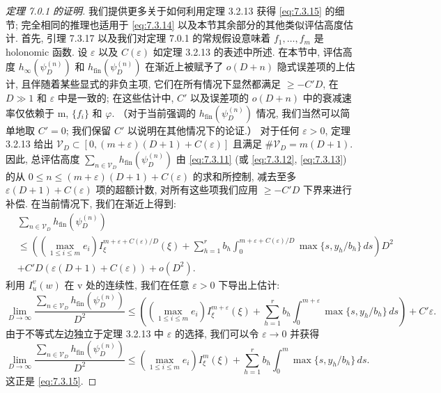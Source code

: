 \begin{proof}[定理 7.0.1 的证明]
我们提供更多关于如何利用定理 3.2.13 获得 \eqref{eq:7.3.15} 的细节; 
完全相同的推理也适用于 \eqref{eq:7.3.14} 以及本节其余部分的其他类似评估高度估计. 
首先, 引理 7.3.17 以及我们对定理 7.0.1 的常规假设意味着 \(f_1, \ldots, f_m\) 是 holonomic 函数. 
设 \(\varepsilon\) 以及 \(C(\varepsilon)\) 如定理 3.2.13 的表述中所述. 
在本节中, 评估高度 \(h_{\infty}(\psi_D^{(n)})\) 和 \(h_{\text{fin}}(\psi_D^{(n)})\) 在渐近上被赋予了 \(o(D+n)\) 隐式误差项的上估计, 
且伴随着某些显式的非负主项, 它们在所有情况下显然都满足 \(\geq -C'D\), 
在 \(D \gg 1\) 和 \(\varepsilon\) 中是一致的; 
在这些估计中, \(C'\) 以及误差项的 \(o(D+n)\) 中的衰减速率仅依赖于 m, \(\{f_i\}\) 和 \(\varphi\). 
（对于当前强调的 \(h_{\text{fin}}(\psi_D^{(n)})\) 情况, 我们当然可以简单地取 \(C' = 0\); 
我们保留 \(C'\) 以说明在其他情况下的论证.） 
对于任何 \(\varepsilon > 0\), 定理 3.2.13 给出 \(\mathcal{V}_D \subset [0, (m+\varepsilon)(D+1)+C(\varepsilon)]\) 且满足 \(\#\mathcal{V}_D = m(D+1)\). 
因此, 总评估高度 \(\sum_{n \in \mathcal{V}_D} h_{\text{fin}}(\psi_D^{(n)})\) 
由 \eqref{eq:7.3.11} (或 \eqref{eq:7.3.12}, \eqref{eq:7.3.13}) 的从 \(0 \leq n \leq (m+\varepsilon)(D+1)+C(\varepsilon)\) 的求和所控制, 
减去至多 \(\varepsilon(D+1)+C(\varepsilon)\) 项的超额计数, 对所有这些项我们应用 \(\geq -C'D\) 下界来进行补偿. 
在当前情况下, 我们在渐近上得到:
\[ \begin{split} &\sum_{n \in \mathcal{V}_D} h_{\text{fin}}(\psi_D^{(n)}) \\ &\leq \left( \left( \max_{1 \leq i \leq m} e_i \right) I_{\xi}^{m+\varepsilon+C(\varepsilon)/D}(\xi) + \sum_{h=1}^r b_h \int_0^{m+\varepsilon+C(\varepsilon)/D} \max\{s, y_h/b_h\} \, ds \right) D^2 \\ &+ C' D(\varepsilon(D+1) + C(\varepsilon)) + o(D^2). \end{split} \]
利用 \(I_u^v(w)\) 在 v 处的连续性, 我们在任意 \(\varepsilon > 0\) 下导出上估计:
\[ \lim_{D\to\infty}\frac{\sum_{n\in\mathcal{V}_D}h_{\mathrm{fin}}(\psi_D^{(n)})}{D^2}\leq \left(\left(\max_{1\leq i\leq m}e_i\right)I_\xi^{m+\varepsilon}(\xi)+\sum_{h=1}^rb_h\int_0^{m+\varepsilon}\max\{s,y_h/b_h\}\,ds\right)+C'\varepsilon. \]
由于不等式左边独立于定理 3.2.13 中 \(\varepsilon\) 的选择, 我们可以令 \(\varepsilon \to 0\) 并获得
\[ \lim_{D \to \infty} \frac{\sum_{n \in \mathcal{V}_D} h_{\text{fin}}(\psi_D^{(n)})}{D^2} \le \left(\max_{1 \le i \le m} e_i\right) I_{\xi}^m(\xi) + \sum_{h=1}^r b_h \int_0^m \max\{s, y_h/b_h\} \, ds. \]
这正是 \eqref{eq:7.3.15}.


\end{proof}

